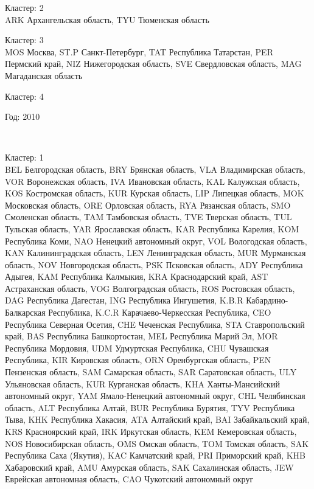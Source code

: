 \documentclass[11pt]{article}
\begin{document}
Кластер:  2 \\
ARK Архангельская область, TYU Тюменская область

Кластер:  3 \\
MOS Москва, ST.P Санкт-Петербург, TAT Республика Татарстан, PER Пермский край, NIZ Нижегородская область, SVE Свердловская область, MAG Магаданская область

Кластер:  4 \\

\begin{center}
Год:  2010
\end{center}


    \begin{center}
    \end{center}
    { \hspace*{\fill} \\}
    

Кластер:  1 \\
BEL Белгородская область, BRY Брянская область, VLA Владимирская область, VOR Воронежская область, IVA Ивановская область, KAL Калужская область, KOS Костромская область, KUR Курская область, LIP Липецкая область, MOK Московская область, ORE Орловская область, RYA Рязанская область, SMO Смоленская область, TAM Тамбовская область, TVE Тверская область, TUL Тульская область, YAR Ярославская область, KAR Республика Карелия, KOM Республика Коми, NAO Ненецкий автономный округ, VOL Вологодская область, KAN Калинингpадская область, LEN Ленинградская область, MUR Мурманская область, NOV Новгородская область, PSK Псковская область, ADY Республика Адыгея, KAM Республика Калмыкия, KRA Краснодарский край, AST Астраханская область, VOG Волгоградская область, ROS Ростовская область, DAG Республика Дагестан, ING Республика Ингушетия, K.B.R Кабардино-Балкарская Республика, K.C.R Карачаево-Черкесская Республика, CEO Республика Северная Осетия, CHE Чеченская Республика, STA Ставропольский край, BAS Республика Башкортостан, MEL Республика Марий Эл, MOR Республика Мордовия, UDM Удмуртская Республика, CHU Чувашская Республика, KIR Кировская область, ORN Оренбургская область, PEN Пензенская область, SAM Самарская область, SAR Саратовская область, ULY Ульяновская область, KUR Курганская область, KHA Ханты-Мансийский автономный округ, YAM Ямало-Ненецкий автономный округ, CHL Челябинская область, ALT Республика Алтай, BUR Республика Бурятия, TYV Республика Тыва, KHK Республика Хакасия, ATA Алтайский край, BAI Забайкальский край, KRS Красноярский край, IRK Иркутская область, KEM Кемеровская область, NOS Новосибирская область, OMS Омская область, TOM Томская область, SAK Республика Саха (Якутия), KAC Камчатский край, PRI Приморский край, KHB Хабаровский край, AMU Амурская область, SAK Сахалинская область, JEW Еврейская автономная область, CAO Чукотский автономный округ
\end{document}

